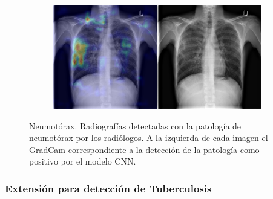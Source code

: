 \begin{figure}[b]
\begin{subfigure}{0.4\textwidth}
    \end{subfigure}
    \begin{subfigure}{0.4\textwidth}
        \centering
        \includegraphics[width=1.0\textwidth]{Chapters/5. Conclusiones/img/Pneumothorax/1_1_00001006_021.png}
    \end{subfigure}

    \caption{Neumotórax. Radiografías detectadas con la patología de neumotórax por los
                    radiólogos. A la izquierda de cada imagen el GradCam correspondiente a la detección
                    de la patología como positivo por el modelo CNN.}
    \label{fig-ntorx}
\end{figure}


\subsubsection{Extensión para detección de Tuberculosis}

